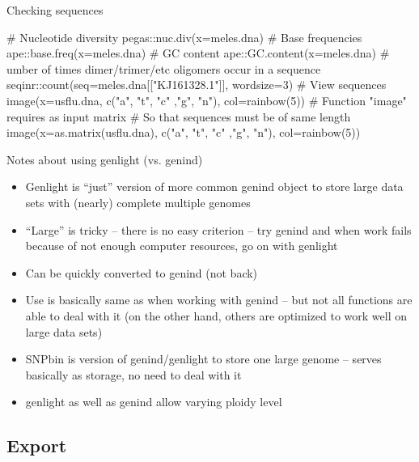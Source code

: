 \documentclass[compress, ucs, xelatex, 11pt, xcolor=svgnames,
  hyperref={
    bookmarks=true,
    unicode=true,
    colorlinks=true,
    pdftitle={Molecular data in R},
    plainpages=false,
    pdfauthor={Vojtech Zeisek},
    pdfsubject={Course about phylogeny and evolution in R},
    pdfcreator={XeLaTeX},
    pdfkeywords={R, evolution, phylogeny, molecular data},
    linkcolor=Tomato,
    anchorcolor=SaddleBrown,
    citecolor=Goldenrod,
    filecolor=DarkMagenta,
    menucolor=Sienna,
    urlcolor=DarkTurquoise,
    pdftex},
  url={hyphens, lowtilde} %
  ]{beamer}
\begin{document}
\begin{frame}[fragile]{Checking sequences}
  \begin{spluscode}
    # Nucleotide diversity
    pegas::nuc.div(x=meles.dna)
    # Base frequencies
    ape::base.freq(x=meles.dna)
    # GC content
    ape::GC.content(x=meles.dna)
    # umber of times dimer/trimer/etc oligomers occur in a sequence
    seqinr::count(seq=meles.dna[["KJ161328.1"]], wordsize=3)
    # View sequences
    image(x=usflu.dna, c("a", "t", "c" ,"g", "n"), col=rainbow(5))
    # Function "image" requires as input matrix
    # So that sequences must be of same length
    image(x=as.matrix(usflu.dna), c("a", "t", "c" ,"g", "n"),
      col=rainbow(5))
  \end{spluscode}
\end{frame}

\begin{frame}{Notes about using genlight (vs. genind)}
\begin{itemize}
 \item Genlight is ``just'' version of more common genind object to store large data sets with (nearly) complete multiple genomes
 \item ``Large'' is tricky -- there is no easy criterion -- try genind and when work fails because of not enough computer resources, go on with genlight
 \item Can be quickly converted to genind (not back)
 \item Use is basically same as when working with genind -- but not all functions are able to deal with it (on the other hand, others are optimized to work well on large data sets)
 \item SNPbin is version of genind/genlight to store one large genome -- serves basically as storage, no need to deal with it
 \item genlight as well as genind allow varying ploidy level
\end{itemize}
\end{frame}

\subsection{Export}
\end{document}
